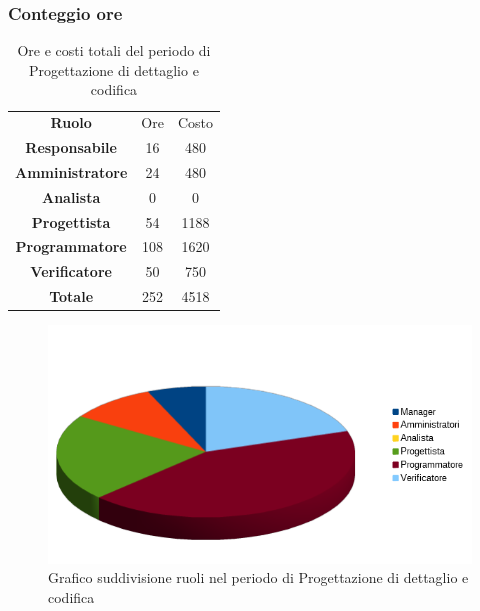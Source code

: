 \subsubsection{Conteggio ore}
\begin{table}[h!]
	\centering
	\renewcommand{\arraystretch}{2} 
	\begin{tabular}{| c c c|}
		\rowcolor{orange!50}
		\hline
		\multicolumn{3}{|c|}{\textbf{Suddivisione ruoli in ore}}\\
		\hline
		\textbf{Ruolo} 			& Ore 	& Costo\\
		\hline
		\textbf{Responsabile}	&16		&480\\
		\hline
		\textbf{Amministratore}	&24		&480\\
		\hline
		\textbf{Analista}		&0		&0\\
		\hline
		\textbf{Progettista}	&54		&1188\\
		\hline
		\textbf{Programmatore}	&108	&1620\\
		\hline
		\textbf{Verificatore} 	&50		&750\\
		\hline
		\textbf{Totale} 		&252	&4518\\
		\hline 
	\end{tabular}
	\caption{Ore e costi totali del periodo di Progettazione di dettaglio e codifica}
\end{table}

\begin{figure}[h!]
	\centering
	\includegraphics[width=\textwidth]{preventivo/torta_terza_parte.png}
	\caption{Grafico suddivisione ruoli nel periodo di Progettazione di dettaglio e codifica}
\end{figure}